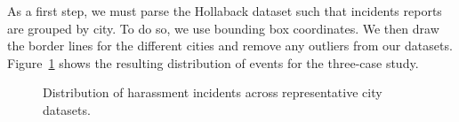 \documentclass{acm_proc_article-sp}
\begin{document}
As a first step, we must parse the Hollaback dataset such that incidents reports are grouped by city. To do so, we use bounding box coordinates. We then draw the border lines for the different cities and remove any outliers from our datasets. Figure~\ref{fig:citiesDistribution} shows the resulting distribution of events for the three-case study. \par
\begin{figure}[!h]
\centering
{}\par\medskip
{}\par\medskip     
{}
\caption{Distribution of harassment incidents across representative city datasets.}
\label{fig:citiesDistribution}
\end{figure}
\end{document}
